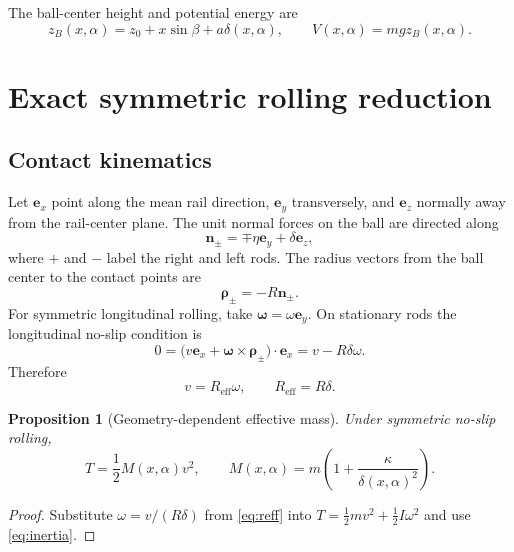 \documentclass[11pt]{article}
\numberwithin{equation}{section}
\newtheorem{proposition}{Proposition}[section]
\theoremstyle{definition}
\theoremstyle{remark}
\begin{document}
The ball-center height and potential energy are
\begin{equation}
  z_B(x,\alpha)=z_0+x\sin\beta+a\delta(x,\alpha),
  \qquad
  V(x,\alpha)=mgz_B(x,\alpha).
  \label{eq:zV}
\end{equation}

\section{Exact symmetric rolling reduction}

\subsection{Contact kinematics}

Let $\bm e_x$ point along the mean rail direction, $\bm e_y$ transversely, and $\bm e_z$ normally away from the rail-center plane.  The unit normal forces on the ball are directed along
\begin{equation}
  \bm n_\pm=\mp\eta\bm e_y+\delta\bm e_z,
  \label{eq:normals}
\end{equation}
where $+$ and $-$ label the right and left rods.  The radius vectors from the ball center to the contact points are
\begin{equation}
  \bm\rho_\pm=-R\bm n_\pm.
\end{equation}
For symmetric longitudinal rolling, take $\bm\omega=\omega\bm e_y$.  On stationary rods the longitudinal no-slip condition is
\begin{equation}
  0=\bigl(v\bm e_x+\bm\omega\times\bm\rho_\pm\bigr)\cdot\bm e_x
   =v-R\delta\omega.
\end{equation}
Therefore
\begin{equation}
  v=R_{\mathrm{eff}}\omega,
  \qquad
  R_{\mathrm{eff}}=R\delta.
  \label{eq:reff}
\end{equation}

\begin{proposition}[Geometry-dependent effective mass]
Under symmetric no-slip rolling,
\begin{equation}
  T=\frac12M(x,\alpha)v^2,
  \qquad
  M(x,\alpha)=m\left(1+\frac{\kappa}{\delta(x,\alpha)^2}\right).
  \label{eq:Meff}
\end{equation}
\end{proposition}

\begin{proof}
Substitute $\omega=v/(R\delta)$ from \cref{eq:reff} into
$T=\frac12mv^2+\frac12I\omega^2$ and use \cref{eq:inertia}.
\end{proof}
\end{document}
